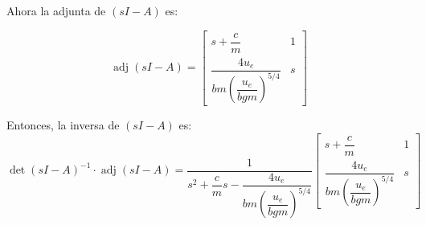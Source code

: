Ahora la adjunta de \( (sI - A) \) es:

\begin{equation*}
    \operatorname{adj}(sI - A) = 
    \begin{bmatrix}
    s + \dfrac{c}{m} & 1 \\[2ex]
    \dfrac{4u_{e}}{bm \left( \dfrac{u_{e}}{bgm} \right)^{5/4}} & s
    \end{bmatrix}
\end{equation*}


Entonces, la inversa de \( (sI - A) \) es:
\begin{equation*}
    \det(sI - A)^{-1} \cdot \operatorname{adj}(sI - A) = 
\dfrac{1}{s^2 + \dfrac{c}{m}s - \dfrac{4u_{e}}{bm \left( \dfrac{u_{e}}{bgm} \right)^{5/4}}} 
\begin{bmatrix}
s + \dfrac{c}{m} & 1 \\[2ex]
\dfrac{4u_{e}}{bm \left( \dfrac{u_{e}}{bgm} \right)^{5/4}} & s
\end{bmatrix}
\end{equation*}




